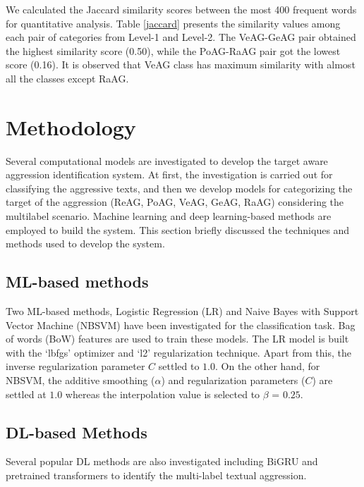 \documentclass[11pt]{article}
\begin{document}
We calculated the Jaccard similarity scores between the most 400 frequent words for quantitative analysis. Table \ref{jaccard} presents the similarity values among each pair of categories from Level-1 and Level-2. The VeAG-GeAG pair obtained the highest similarity score (0.50), while the PoAG-RaAG pair got the lowest score (0.16). It is observed that VeAG class has maximum similarity with almost all the classes except RaAG.

\section{Methodology}
Several computational models are investigated to develop the target aware aggression identification system. At first, the investigation is carried out for classifying the aggressive texts, and then we develop models for categorizing the target of the aggression (ReAG, PoAG, VeAG, GeAG, RaAG) considering the multilabel scenario. Machine learning and deep learning-based methods are employed to build the system. This section briefly discussed the techniques and methods used to develop the system. 


\subsection{ML-based methods}
Two ML-based methods, Logistic Regression (LR) \cite{sharif2019automatic} and Naive Bayes with Support Vector Machine (NBSVM) \cite{wang2012baselines} have been investigated for the classification task. Bag of words (BoW) features are used to train these models. The LR model is built with the `lbfgs' optimizer and `l2' regularization technique. Apart from this, the inverse regularization parameter $C$ settled to $1.0$. On the other hand, for NBSVM, the additive smoothing ($\alpha$) and regularization parameters ($C$) are settled at $1.0$ whereas the interpolation value is selected to $\beta$ = $0.25$.

\subsection{DL-based Methods}
Several popular DL methods are also investigated including BiGRU \cite{marpaung2021hate} and pretrained transformers \cite{vaswani2017attention} to identify the multi-label textual aggression.  
\end{document}
